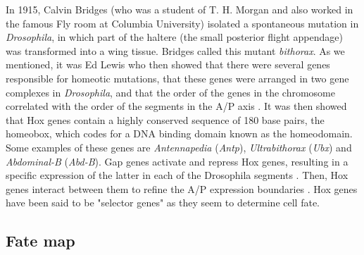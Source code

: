 In 1915, Calvin Bridges (who was a student of T. H. Morgan and also worked in the famous Fly room at Columbia University) isolated a spontaneous mutation in \textit{Drosophila}, in which part of the haltere (the small posterior flight appendage) was transformed into a wing tissue. Bridges called this mutant \textit{bithorax}.
As we mentioned, it was Ed Lewis who then showed that there were several genes responsible for homeotic mutations, that these genes were arranged in two gene complexes in \textit{Drosophila}, and that the order of the genes in the chromosome correlated with the order of the segments in the A/P axis \citep{Lewis1978}.
It was then showed that Hox genes contain a highly conserved sequence of 180 base pairs, the homeobox, which codes for a DNA binding domain known as the homeodomain. 
Some examples of these genes are \textit{Antennapedia} (\textit{Antp}), \textit{Ultrabithorax} (\textit{Ubx}) and \textit{Abdominal-B} (\textit{Abd-B}).
Gap genes activate and repress Hox genes, resulting in a specific expression of the latter in each of the Drosophila segments \citep{Jaeger2011}. Then, Hox genes interact between them to refine the A/P expression boundaries \citep{Hughes2002}.
Hox genes have been said to be "selector genes" \citep{Garcia-Bellido1973,Carroll2001} as they seem to determine cell fate.

\subsection{Fate map}

